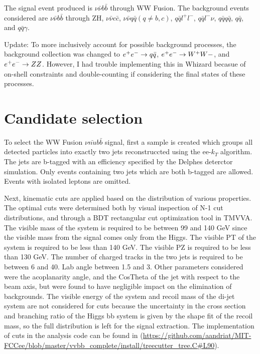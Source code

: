 \documentclass[preprintnumbers,nofootinbib,noshowpacs,eqsecnum,prd,superscriptaddress,letterpaper]{revtex4}
\begin{document}
The signal event produced is $\nu\bar{\nu}b\bar{b}$ through WW Fusion. The background events considered are $\nu\bar{\nu}b\bar{b}$ through ZH, $\nu\bar{\nu}c\bar{c}$, $\nu\bar{\nu}q\bar{q} (q\neq b,c)$, $q\bar{q}l^+l^-$, $q\bar{q}l^-\nu$, $q\bar{q}q\bar{q}$, $q\bar{q}$, and $q\bar{q}\gamma$. 

Update: To more inclusively account for possible background processes, the background collection was changed to $e^+e^-\rightarrow q\bar{q}$, $e^+e^-\rightarrow W^{+}W{-}$, and $e^+e^-\rightarrow ZZ$. However, I had trouble implementing this in Whizard becasue of on-shell constraints and double-counting if considering the final states of these processes. 

\section{Candidate selection}
\label{sec:selection}

To select the WW Fusion $\nu\bar{nu}b\bar{b}$ signal, first a sample is created which groups all detected particles into exactly two jets reconstruccted using the ee-$k_T$ algorithm. The jets are b-tagged with an efficiency specified by the Delphes deterctor simulation. Only events containing two jets which are both b-tagged are allowed. Events with isolated leptons are omitted. 

Next, kinematic cuts are applied based on the distribution of various properties. The optimal cuts were determined both by visual inspection of N-1 cut distributions, and through a BDT rectangular cut optimization tool in TMVVA. The visible mass of the system is required to be between 99 and 140 GeV since the visible mass from the signal comes only from the Higgs. The visible PT of the system is required to be less than 140 GeV. The visible PZ is required to be less than 130 GeV. The number of charged tracks in the two jets is required to be between 6 and 40. Lab angle between 1.5 and 3. Other parameters considered were the acoplanarity angle, and the CosTheta of the jet with respect to the beam axis, but were found to have negligible impact on the elimination of backgrounds. The visible energy of the system and recoil mass of the di-jet system are not considered for cuts because the uncertainty in the cross section and branching ratio of the Higgs bb system is given by the shape fit of the recoil mass, so the full distribution is left for the signal extraction. The implementation of cuts in the analysis code can be found in (\url{https://github.com/aandriat/MIT-FCCee/blob/master/vvbb_complete/install/treecutter_tree.C#L90}). 
\end{document}
